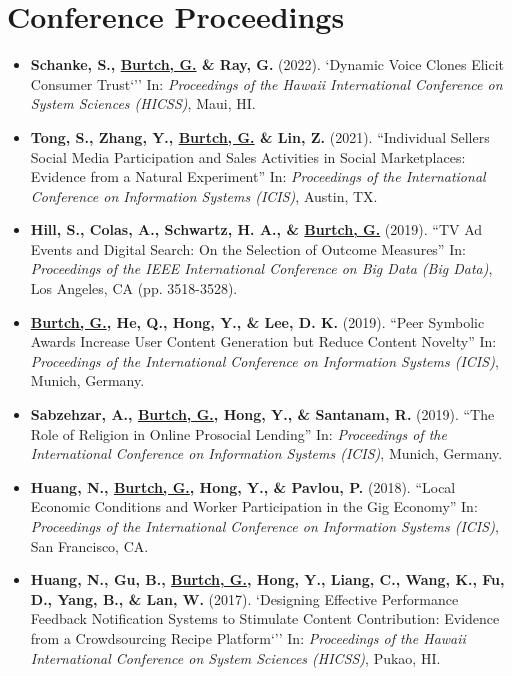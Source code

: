 \documentclass[10.5pt,letterpaper,sans]{moderncv}        %
\begin{document}
\section{Conference Proceedings}

\begin{itemize}

\item \textbf{Schanke, S., \underline{Burtch, G.} \& Ray, G.} (2022). `Dynamic Voice Clones Elicit Consumer Trust`'' In: \textit{Proceedings of the Hawaii International Conference on System Sciences (HICSS)}, Maui, HI.

\item \textbf{Tong, S., Zhang, Y., \underline{Burtch, G.} \& Lin, Z.} (2021). ``Individual Sellers Social Media Participation and Sales Activities in Social Marketplaces: Evidence from a Natural Experiment'' In: \textit{Proceedings of the International Conference on Information Systems (ICIS)}, Austin, TX.

\item \textbf{Hill, S., Colas, A., Schwartz, H. A., \& \underline{Burtch, G.}} (2019). ``TV Ad Events and Digital Search: On the Selection of Outcome Measures'' In: \textit{Proceedings of the IEEE International Conference on Big Data (Big Data)}, Los Angeles, CA (pp. 3518-3528).

\item \textbf{\underline{Burtch, G.}, He, Q., Hong, Y., \& Lee, D. K.} (2019). ``Peer Symbolic Awards Increase User Content Generation but Reduce Content Novelty'' In: \textit{Proceedings of the International Conference on Information Systems (ICIS)}, Munich, Germany.

\item \textbf{Sabzehzar, A., \underline{Burtch, G.}, Hong, Y., \& Santanam, R.} (2019). ``The Role of Religion in Online Prosocial Lending'' In: \textit{Proceedings of the International Conference on Information Systems (ICIS)}, Munich, Germany.

\item \textbf{Huang, N., \underline{Burtch, G.}, Hong, Y., \& Pavlou, P.} (2018). ``Local Economic Conditions and Worker Participation in the Gig Economy'' In: \textit{Proceedings of the International Conference on Information Systems (ICIS)}, San Francisco, CA.

\item \textbf{Huang, N., Gu, B., \underline{Burtch, G.}, Hong, Y., Liang, C., Wang, K., Fu, D., Yang, B., \& Lan, W.} (2017). `Designing Effective Performance Feedback Notification Systems to Stimulate Content Contribution: Evidence from a Crowdsourcing Recipe Platform`'' In: \textit{Proceedings of the Hawaii International Conference on System Sciences (HICSS)}, Pukao, HI.


\end{itemize}
\end{document}
